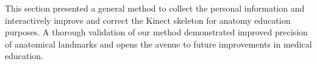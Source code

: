 This section presented a general method to collect the personal information and interactively improve and correct the Kinect skeleton for anatomy education purposes. 
A thorough validation of our method demonstrated improved precision of anatomical landmarks and opens the avenue to future improvements in medical education.